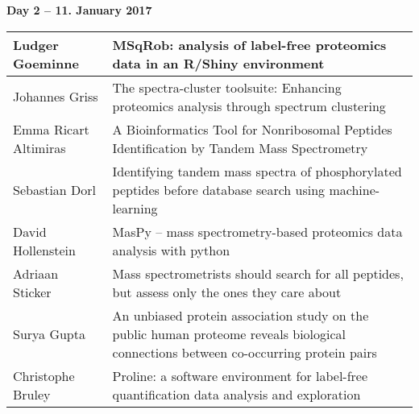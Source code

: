 
\noindent\textbf{Day 2 -- 11. January 2017}

\begin{table}[!h]
  \centering
  \begin{tabular}{ | L{0.23\textwidth} | L{0.7\textwidth} | }
    \hline
    Ludger Goeminne       & MSqRob: analysis of label-free proteomics data in an R/Shiny environment                                                                                                  \\
    \hline
    Johannes Griss        & The spectra-cluster toolsuite: Enhancing proteomics analysis through spectrum clustering                                                                                  \\
    \hline
    Emma Ricart Altimiras & A Bioinformatics Tool for Nonribosomal Peptides Identification by Tandem Mass Spectrometry                                                                                \\
    \hline
    Sebastian Dorl        & Identifying tandem mass spectra of phosphorylated peptides before database search using machine-learning                                                                  \\
    \hline
    David Hollenstein     & MasPy – mass spectrometry-based proteomics data analysis with python                                                                                                      \\
    \hline
    Adriaan Sticker       & Mass spectrometrists should search for all peptides, but assess only the ones they care about                                                                             \\
    \hline
    Surya Gupta           & An unbiased protein association study on the public human proteome reveals biological connections between co-occurring protein pairs                                      \\
    \hline
    Christophe Bruley     & Proline: a software environment for label-free quantification data analysis and exploration                                                                               \\
    \hline
  \end{tabular}
\end{table}

